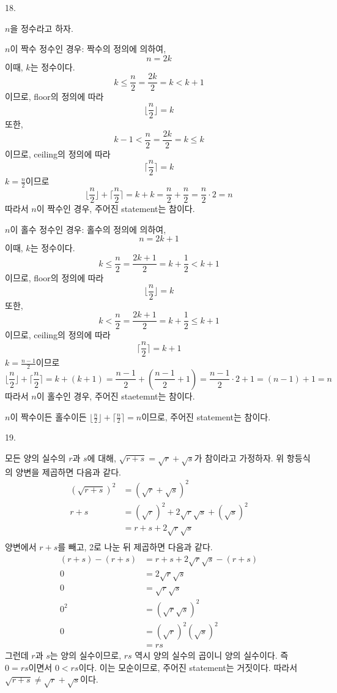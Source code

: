 \documentclass{article}
\begin{document}
18.
\begin{addmargin}[1em]{2em}
$n$을 정수라고 하자.
\newline

$n$이 짝수 정수인 경우: 짝수의 정의에 의하여,
\[n=2k\]
이때, $k$는 정수이다.
\[k \le \frac{n}{2}=\frac{2k}{2}=k < k+1\]
이므로, floor의 정의에 따라
\[\lfloor \frac{n}{2} \rfloor = k\]
또한,
\[k-1 < \frac{n}{2}=\frac{2k}{2}=k \le k\]
이므로, ceiling의 정의에 따라
\[\lceil \frac{n}{2} \rceil = k\]
$k = \frac{n}{2}$이므로
\[\lfloor \frac{n}{2} \rfloor + \lceil \frac{n}{2} \rceil = k + k = \frac{n}{2} + \frac{n}{2} = \frac{n}{2}\cdot 2 = n\]
따라서 $n$이 짝수인 경우, 주어진 statement는 참이다.
\newline

$n$이 홀수 정수인 경우: 홀수의 정의에 의하여,
\[n=2k + 1\]
이때, $k$는 정수이다.
\[k \le \frac{n}{2}=\frac{2k+1}{2}= k + \frac{1}{2}< k+1\]
이므로, floor의 정의에 따라
\[\lfloor \frac{n}{2} \rfloor = k\]
또한,
\[k < \frac{n}{2}=\frac{2k+1}{2}= k + \frac{1}{2} \le k+1\]
이므로, ceiling의 정의에 따라
\[\lceil \frac{n}{2} \rceil = k+1\]
$k = \frac{n-1}{2}$이므로
\[\lfloor \frac{n}{2} \rfloor + \lceil \frac{n}{2} \rceil = k + (k + 1) = \frac{n-1}{2} + (\frac{n-1}{2} + 1) = \frac{n-1}{2}\cdot 2 + 1 = (n - 1) + 1 = n\]
따라서 $n$이 홀수인 경우, 주어진 staetemnt는 참이다.
\newline

$n$이 짝수이든 홀수이든 $\lfloor \frac{n}{2} \rfloor + \lceil \frac{n}{2} \rceil = n$이므로, 주어진 statement는 참이다.
\end{addmargin}
\bigskip

19.
\begin{addmargin}[1em]{2em}
모든 양의 실수의 $r$과 $s$에 대해, $\sqrt{r+s}=\sqrt{r} + \sqrt{s}$가 참이라고 가정하자.
위 항등식의 양변을 제곱하면 다음과 같다.
\begin{align*}
    (\sqrt{r + s})^2 &= (\sqrt{r} + \sqrt{s})^2 \\
    r + s &= (\sqrt{r})^2 + 2\sqrt{r}\sqrt{s} + (\sqrt{s})^2 \\
    &= r + s + 2\sqrt{r}\sqrt{s} \\
\end{align*}
양변에서 $r+s$를 빼고, 2로 나눈 뒤 제곱하면 다음과 같다.
\begin{align*}
    (r + s) - (r + s) &= r + s + 2\sqrt{r}\sqrt{s} - (r + s)\\
    0 &= 2\sqrt{r}\sqrt{s} \\
    0 &= \sqrt{r}\sqrt{s} \\
    0^2 &= (\sqrt{r}\sqrt{s})^2 \\
    0 &= (\sqrt{r})^2(\sqrt{s})^2 \\
    &= rs
\end{align*}
그런데 $r$과 $s$는 양의 실수이므로, $rs$ 역시 양의 실수의 곱이니 양의 실수이다. 즉 $0 = rs$이면서 $0 < rs$이다. 이는 모순이므로, 주어진 statement는 거짓이다. 따라서 $\sqrt{r+s}\ne\sqrt{r} + \sqrt{s}$이다.
\end{addmargin}
\bigskip
\end{document}
